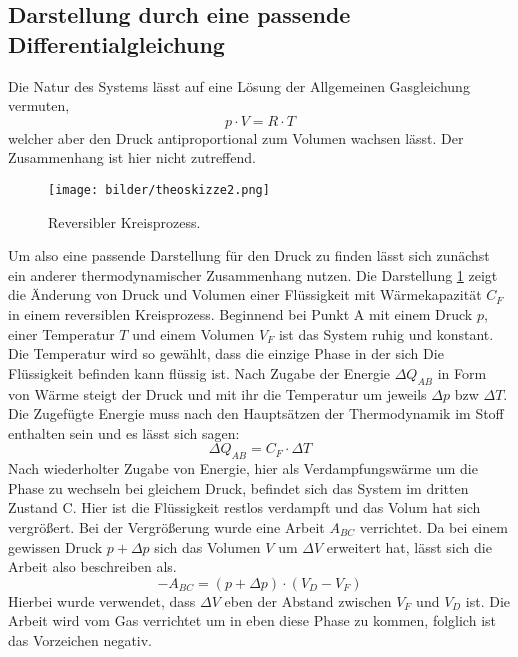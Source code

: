 \subsection{Darstellung durch eine passende Differentialgleichung}
Die Natur des Systems lässt auf eine Lösung der Allgemeinen Gasgleichung vermuten,
\begin{equation}
    \label{eqn:gas}
    p \cdot V = R \cdot T
\end{equation}
welcher aber den Druck antiproportional zum Volumen wachsen lässt. Der Zusammenhang ist hier nicht zutreffend.
\begin{figure}
    \centering
    \texttt{[image: bilder/theoskizze2.png]}
    \caption{Reversibler Kreisprozess. \cite{skript}} 
    \label{fig:figtheo2}
\end{figure}
Um also eine passende Darstellung für den Druck zu finden lässt sich zunächst ein anderer thermodynamischer Zusammenhang nutzen. 
Die Darstellung \ref{fig:figtheo2} zeigt die Änderung von Druck und Volumen einer Flüssigkeit mit Wärmekapazität $C_F$ in einem reversiblen Kreisprozess.
Beginnend bei Punkt A mit einem Druck $p$, einer Temperatur $T$ und einem Volumen $V_F$ ist das System ruhig und konstant. Die Temperatur wird so
gewählt, dass die einzige Phase in der sich Die Flüssigkeit befinden kann flüssig ist.
Nach Zugabe der Energie $\Delta Q_{AB}$ in Form von Wärme steigt der Druck und mit ihr die Temperatur um jeweils $\Delta p$ bzw $\Delta T$.
Die Zugefügte Energie muss nach den Hauptsätzen der Thermodynamik im Stoff enthalten sein und es lässt sich sagen:
\begin{equation}
    \Delta Q_{AB} = C_F \cdot \Delta T
\end{equation}
Nach wiederholter Zugabe von Energie, hier als Verdampfungswärme um die Phase zu wechseln bei gleichem Druck, befindet sich das System im dritten Zustand
C. Hier ist die Flüssigkeit restlos verdampft und das Volum hat sich vergrößert. Bei der Vergrößerung wurde eine Arbeit $A_{BC}$ verrichtet. 
Da bei einem gewissen Druck $p +\Delta p$ sich das Volumen $V$  um $\Delta V$ erweitert hat, lässt sich die Arbeit also beschreiben als.
\begin{equation}
\label{eqn:BC}
    -A_{BC} = (p+ \Delta p) \cdot (V_D-V_F)
\end{equation}
Hierbei wurde verwendet, dass $\Delta V$ eben der Abstand zwischen $V_F$ und $V_D$ ist. Die Arbeit wird vom Gas verrichtet um in eben diese Phase
zu kommen, folglich ist das Vorzeichen negativ. \\
